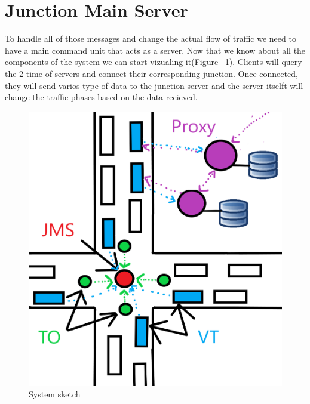 \documentclass[17pt]{report}
\begin{document}
\section{Junction Main Server}
\indent \indent
To handle all of those messages and change the actual flow of traffic we
need to have a main command unit that acts as a server. Now 
that we know about all the components of the system we can 
start vizualing it(Figure ~\ref{fig:System_sketch}). Clients will query the 
2 time of servers and connect their corresponding junction. Once connected, 
they will send varios type of data to the junction server and the server itselft 
will change the traffic phases based on the data recieved.

\begin{figure}[h!]
    \includegraphics[width=\textwidth]{Sketches/SchitaSistem.png}
    \caption{System sketch}
    \label{fig:System_sketch}
\end{figure}

\pagebreak
\end{document}
